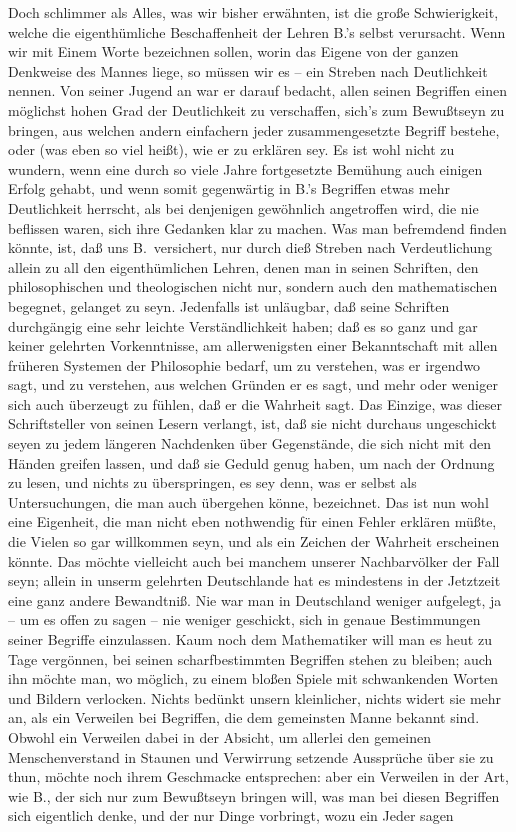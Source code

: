 Doch schlimmer als Alles, was wir bisher erwähnten, ist die große Schwierigkeit, welche die eigenthümliche Beschaffenheit der Lehren B.'s selbst verursacht. Wenn wir mit Einem Worte bezeichnen sollen, worin das Eigene von der ganzen Denkweise des Mannes liege, so müssen wir es -- ein Streben nach Deutlichkeit nennen. Von seiner Jugend an war er darauf bedacht, allen seinen Begriffen einen möglichst hohen Grad der Deutlichkeit zu verschaffen, sich's zum Bewußtseyn zu bringen, aus welchen andern einfachern jeder zusammengesetzte Begriff bestehe, oder (was eben so viel heißt), wie er zu erklären sey. Es ist wohl nicht zu wundern, wenn eine durch so viele Jahre fortgesetzte Bemühung auch einigen Erfolg gehabt, und wenn somit gegenwärtig in B.'s Begriffen etwas mehr Deutlichkeit herrscht, als bei denjenigen gewöhnlich angetroffen wird, die nie beflissen waren, sich ihre Gedanken klar zu machen. Was man befremdend finden könnte, ist, daß uns B.\ versichert, nur durch dieß Streben nach Verdeutlichung allein zu all den eigenthümlichen Lehren, denen man in seinen Schriften, den philosophischen und theologischen nicht nur, sondern auch den mathematischen begegnet, gelanget zu seyn. Jedenfalls ist unläugbar, daß seine Schriften durchgängig eine sehr leichte Verständlichkeit haben; daß es so ganz und gar keiner gelehrten Vorkenntnisse, am allerwenigsten einer  Bekanntschaft mit allen früheren Systemen der Philosophie bedarf, um zu verstehen, was er irgendwo sagt, und zu verstehen, aus welchen Gründen er es sagt, und mehr oder weniger sich auch überzeugt zu fühlen, daß er die Wahrheit sagt. Das Einzige, was dieser Schriftsteller von seinen Lesern verlangt, ist, daß sie nicht durchaus ungeschickt seyen zu jedem längeren Nachdenken über Gegenstände, die sich nicht mit den Händen greifen lassen, und daß sie Geduld genug haben, um nach der Ordnung zu lesen, und nichts zu überspringen, es sey denn, was er selbst als Untersuchungen, die man auch übergehen könne, bezeichnet. Das ist nun wohl eine Eigenheit, die man nicht eben nothwendig für einen Fehler erklären müßte, die Vielen so gar willkommen seyn, und als ein Zeichen der Wahrheit erscheinen könnte. Das möchte vielleicht auch bei manchem unserer Nachbarvölker der Fall seyn; allein in unserm gelehrten Deutschlande hat es mindestens in der Jetztzeit eine ganz andere Bewandtniß. Nie war man in Deutschland weniger aufgelegt, ja -- um es offen zu sagen -- nie weniger geschickt, sich in genaue Bestimmungen seiner Begriffe einzulassen. Kaum noch dem Mathematiker will man es heut zu Tage vergönnen, bei seinen scharfbestimmten Begriffen stehen zu bleiben; auch ihn möchte man, wo möglich, zu einem bloßen Spiele mit schwankenden Worten und Bildern verlocken. Nichts bedünkt unsern  kleinlicher, nichts widert sie mehr an, als ein Verweilen bei Begriffen, die dem gemeinsten Manne bekannt sind. Obwohl ein Verweilen dabei in der Absicht, um allerlei den gemeinen Menschenverstand in Staunen und Verwirrung setzende Aussprüche über sie zu thun, möchte noch ihrem Geschmacke entsprechen: aber ein Verweilen in der Art, wie B., der sich nur zum Bewußtseyn bringen will, was man bei diesen Begriffen sich eigentlich denke, und der nur Dinge vorbringt, wozu ein  Jeder sagen 